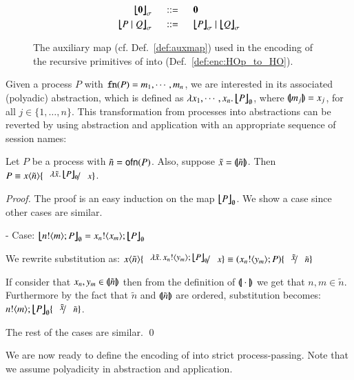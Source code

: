 \begin{definition}
\begin{figure}[t]
\[\begin{array}{rcl}
		\auxmap{\inact}{\sigma} &\bnfis& \inact
		\vspace{1mm} \\

		\auxmap{P \Par Q}{\sigma} &\bnfis& \auxmap{P}{\sigma} \Par \auxmap{Q}{\sigma}
	\end{array}
\]
\caption{\label{fig:auxmap} The auxiliary map (cf. Def.~\ref{def:auxmap}) 
used in the encoding of the recursive primitives of \HOp into \HO (Def.~\ref{def:enc:HOp_to_HO}).}
\end{figure}
\end{definition}

Given a process $P$ with $\mathtt{fn}(P) = m_1, \cdots, m_n$,
we are interested in its associated (polyadic) abstraction,
which is defined as $\lambda x_1, \cdots, x_n.\,\big\lfloor\!\!\big\lfloor P\big\rfloor\!\!\big\rfloor_{\emptyset}$,
where $(\!|\!|m_j|\!|\!) = x_j$, for all $j \in \{1, \ldots, n\}$.
This transformation from processes into abstractions can be reverted by
using abstraction and application with an appropriate sequence of session names:
%
\begin{proposition}\rm
	Let $P$ be a \HOp process with $\tilde{n} = \mathsf{ofn}(P)$.
	Also, suppose $\tilde{x} = (\!|\!|\tilde{n}|\!|\!)$.
	Then $P \scong \appl{x}{\tilde{n}}\subst{\abs{\tilde{x}}\auxmap{P}{\emptyset}}{x}$.
\end{proposition}

\begin{proof}
	\noi The proof is an easy induction on the map $\big\lfloor\!\!\big\lfloor P\big\rfloor\!\!\big\rfloor_{\emptyset}$.
	We show a case since other cases are similar.

	\noi - Case: $\auxmap{\bout{n}{m} P}{\es} = \bout{x_n}{x_m} \auxmap{P}{\es}$

	\noi We rewrite substitution as:
	$\appl{x}{\tilde{n}} \subst{\abs{\tilde{x}}{\bout{x_n}{y_m} \auxmap{P}{\es}}}{x} \scong (\bout{x_n}{y_m} P) \subst{\tilde{x}}{\tilde{n}}$

	\noi If consider that $x_n, y_m \in (\!|\!|\tilde{n}|\!|\!)$ then from the definition of $(\!|\!|\cdot|\!|\!)$ we
	get that $n, m \in \tilde{n}$. Furthermore by the fact that $\tilde{n}$ and $(\!|\!|\tilde{n}|\!|\!)$ are
	ordered, substitution becomes:
	$\bout{n}{m} \auxmap{P}{\es} \subst{\tilde{x}}{\tilde{n}}$.

	\noi The rest of the cases are similar.
	\qed
\end{proof}


We are now ready to define the encoding of \HOp
into strict process-passing. Note that we assume polyadicity 
in abstraction and application.

